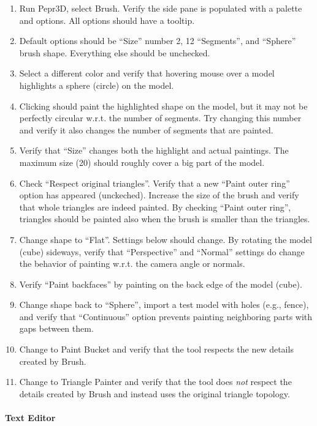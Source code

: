 \begin{enumerate}
\item Run Pepr3D, select Brush. Verify the side pane is populated with a palette and options. All options should have a tooltip.
\item Default options should be ``Size'' number 2, 12 ``Segments'', and ``Sphere'' brush shape. Everything else should be unchecked.
\item Select a different color and verify that hovering mouse over a model highlights a sphere (circle) on the model.
\item Clicking should paint the highlighted shape on the model, but it may not be perfectly circular w.r.t. the number of segments. Try changing this number and verify it also changes the number of segments that are painted.
\item Verify that ``Size'' changes both the highlight and actual paintings. The maximum size (20) should roughly cover a big part of the model.
\item Check ``Respect original triangles''. Verify that a new ``Paint outer ring'' option has appeared (unckeched). Increase the size of the brush and verify that whole triangles are indeed painted. By checking ``Paint outer ring'', triangles should be painted also when the brush is smaller than the triangles.
\item Change shape to ``Flat''. Settings below should change. By rotating the model (cube) sideways, verify that ``Perspective'' and ``Normal'' settings do change the behavior of painting w.r.t. the camera angle or normals.
\item Verify ``Paint backfaces'' by painting on the back edge of the model (cube).
\item Change shape back to ``Sphere'', import a test model with holes (e.g., fence), and verify that ``Continuous'' option prevents painting neighboring parts with gaps between them.
\item Change to Paint Bucket and verify that the tool respects the new details created by Brush.
\item Change to Triangle Painter and verify that the tool does \emph{not} respect the details created by Brush and instead uses the original triangle topology.
\end{enumerate}

\paragraph{Text Editor}

